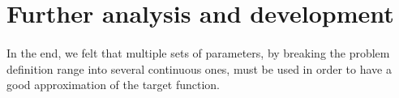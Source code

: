 \documentclass{article}
\begin{document}
   \section{Further analysis and development} %
   \label{sec:section name}
   \paragraph{} %
   \label{par:}
   
     In the end, we felt that multiple sets of parameters, by breaking the problem
     definition range into several continuous ones, must be used in order to have
     a good approximation of the target function.

  
\end{document}
